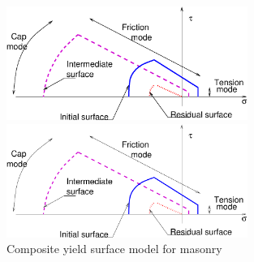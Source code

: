 \documentclass[a4paper]{article}
\begin{document}
\begin{figure}[!htb]
\begin{htmlonly}
  \centerline{\includegraphics[width=0.7\textwidth]{constmodel.eps}}
\end{htmlonly}
 \centerline{\includegraphics[width=0.7\textwidth]{constmodel}}
  \caption{Composite yield surface model for masonry}
  \label{compyieldsurffig}
\end{figure}
\end{document}
